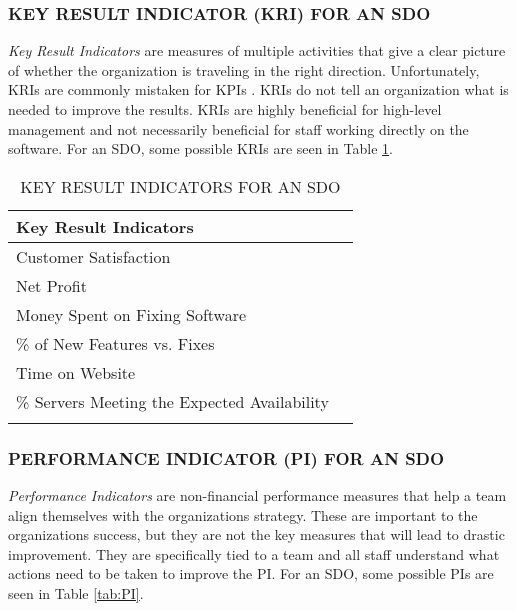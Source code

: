 \documentclass[SDSUThesis.tex]{subfiles}
\begin{document}
        \subsubsection{KEY RESULT INDICATOR (KRI) FOR AN SDO}
            \textit{Key Result Indicators} are measures of multiple
            activities that give a clear picture of whether the
            organization is traveling in the right direction.  Unfortunately,
            KRIs are commonly mistaken for KPIs \cite{parmenter2010}.  KRIs
            do not tell an organization what is needed to improve the 
            results.  KRIs are highly beneficial for high-level management
            and not necessarily beneficial for staff working directly on 
            the software.  For
            an SDO, some possible KRIs are seen in Table \ref{tab:KRI}.
            
            \begin{longtable}{@{}l l}
                \toprule%
                 \centering%
                 {\bfseries Key Result Indicators} &
                 \\
                
                \cmidrule[0.4pt](r{0.125em}){1-1}%
                \endhead
                
                Customer Satisfaction  \\
                \myrowcolour%
                Net Profit \\
                Money Spent on Fixing Software \\
                \myrowcolour%
                \% of New Features vs. Fixes \\
                Time on Website \\
                \myrowcolour%
                \% Servers Meeting the Expected Availability \\
                
                \bottomrule
                
                \caption{KEY RESULT INDICATORS FOR AN SDO}
                \label{tab:KRI}
            \end{longtable}
            
        
        \subsubsection{PERFORMANCE INDICATOR (PI) FOR AN SDO}
            \textit{Performance Indicators} are non-financial performance measures
            that help a team align themselves with the organizations 
            strategy.  These are important to the organizations success, but
            they are not the key measures that will lead to drastic improvement.  They are specifically tied to a team and all staff understand
            what actions need to be taken to improve the PI.
            For an SDO, some possible PIs are seen in Table \ref{tab:PI}.
                
\end{document}
